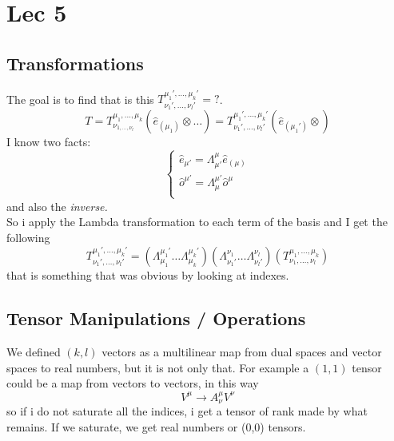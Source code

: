 \section{Lec 5}
\subsection{Transformations}
The goal is to find that is this $T^{\mu_{1}', \ldots , \mu_{k}'}_{\nu_{1}', \ldots , \nu_{l}'}= ?$.
\begin{equation}
T = T^{\mu_{1}, \ldots , \mu_{k}}_{\nu_{1, \ldots , \nu_{l}}} \left( \hat{e}_{\left( \mu_{1} \right)} \otimes \ldots  \right) = T^{\mu_{1}', \ldots , \mu_{k}'}_{\nu_{1}', \ldots , \nu_{l}'} \left( \hat{e}_{\left( \mu_{1}' \right)} \otimes  \right)
\end{equation}
I know two facts:
\begin{equation}
\begin{cases}
\hat{e}_{\mu '} = \Lambda^{\mu }_{\mu '} \hat{e}_{\left( \mu  \right)} \\
\hat{o}^{\mu '} = \Lambda^{\mu' }_{\mu } \hat{o}^{\mu } \\
\end{cases}
\end{equation}
and also the \emph{inverse.} \\

So i apply the Lambda transformation to each term of the basis and I get the following
\begin{equation}
T^{\mu_{1}', \ldots , \mu_{k}'}_{\nu_{1}', \ldots , \nu_{l}' } = \left( \Lambda^{\mu_{1}'}_{\mu_{1}} \ldots \Lambda^{\mu_{k}'}_{\mu_{k}} \right) \left( \Lambda^{\nu_{1}}_{\nu_{1}'} \ldots  \Lambda^{\nu_{l}}_{\nu_{l}'} \right) \left( T^{\mu_{1}, \ldots , \mu_{k}}_{\nu_{1}, \ldots , \nu_{l}} \right)
\end{equation}
that is something that was obvious by looking at indexes.

\subsection{Tensor Manipulations / Operations}
We defined $\left( k,l \right)$ vectors as a multilinear map from dual spaces and vector spaces to real numbers, but it is not only that. For example a $\left( 1,1 \right)$ tensor could be a map from vectors to vectors, in this way
\begin{equation}
V^{\mu } \to A^{\mu }_{\nu } V^{\nu }
\end{equation}
so if i do not saturate all the indices, i get a tensor of rank made by what remains. If we saturate, we get real numbers or (0,0) tensors.

